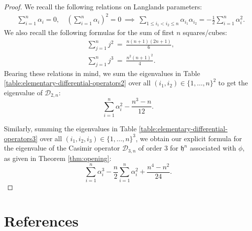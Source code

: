 \documentclass[12pt, reqno, oneside]{amsart}
\numberwithin{equation}{section}
\begin{document}
\begin{proof}
We recall the following relations on Langlands parameters:
\begin{align}\label{eq:symmetric-polynomials}
&\sum_{i=1}^n \alpha_i = 0, \quad \left(\sum_{i=1}^n \alpha_i\right)^2 = 0 \ \implies \ \sum_{1 \leq i_1 < i_2 \leq n}\alpha_{i_1}\alpha_{i_2} = -\frac{1}{2}\sum_{i=1}^n\alpha_i^2.
\end{align}
We also recall the following formulas for the sum of first $n$ squares/cubes:
\begin{align}
&\sum_{j=1}^n j^2 \ = \ \frac{n(n+1)(2n+1)}{6}, \\
&\sum_{j=1}^n j^3 \ = \ \frac{n^2(n+1)^2}{4}.
\end{align}
Bearing these relations in mind, we sum the eigenvalues in Table \ref{table:elementary-differential-operators2} over all $(i_1,i_2) \in \{1, \dots, n\}^2$ to get the eigenvalue of $\mathcal{D}_{2,n}$:
\begin{equation}
\sum_{i=1}^n \alpha_i^2 - \frac{n^3-n}{12}.
\end{equation}

Similarly, summing the eigenvalues in Table \ref{table:elementary-differential-operators3} over all $(i_1,i_2,i_3) \in \{1, \dots, n\}^3$, we obtain our explicit formula for the eigenvalue of the Casimir operator $\mathcal{D}_{3,n}$ of order $3$ for $\mathfrak{h}^n$ associated with $\phi$, as given in Theorem \ref{thm:opening}:
\begin{equation}
\sum_{i=1}^n \alpha_i^3 - \frac{n}{2}\sum_{i=1}^n \alpha_i^2 + \frac{n^4-n^2}{24}.
\end{equation}
\end{proof}

\section*{References}

\printbibliography[heading=none] 
\end{document}
